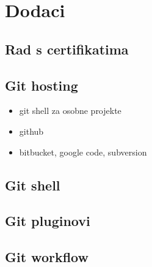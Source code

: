 \chapter*{Dodaci}

\section*{Rad s certifikatima}

\section*{Git hosting}

\begin{itemize}
   \item git shell za osobne projekte
   \item github
   \item bitbucket, google code, subversion
\end{itemize}

\section*{Git shell}

\section*{Git pluginovi}

\section*{Git workflow}

